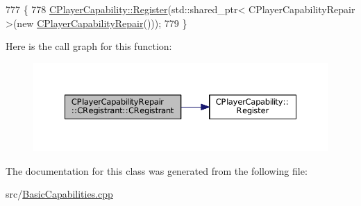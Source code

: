 \begin{DoxyCode}
777                                                \{
778     \hyperlink{classCPlayerCapability_a7e298018dcde2684451add3cfff065f7}{CPlayerCapability::Register}(std::shared\_ptr< CPlayerCapabilityRepair >(\textcolor{keyword}{new} 
      \hyperlink{classCPlayerCapabilityRepair_a1c11519a127c65cd5b5ead8d9537c240}{CPlayerCapabilityRepair}()));   
779 \}
\end{DoxyCode}
Here is the call graph for this function\+:
\nopagebreak
\begin{figure}[H]
\begin{center}
\leavevmode
\includegraphics[width=350pt]{classCPlayerCapabilityRepair_1_1CRegistrant_aeffe332a2dd871a9c29f6d1fa780f473_cgraph}
\end{center}
\end{figure}


The documentation for this class was generated from the following file\+:\begin{DoxyCompactItemize}
\item 
src/\hyperlink{BasicCapabilities_8cpp}{Basic\+Capabilities.\+cpp}\end{DoxyCompactItemize}
